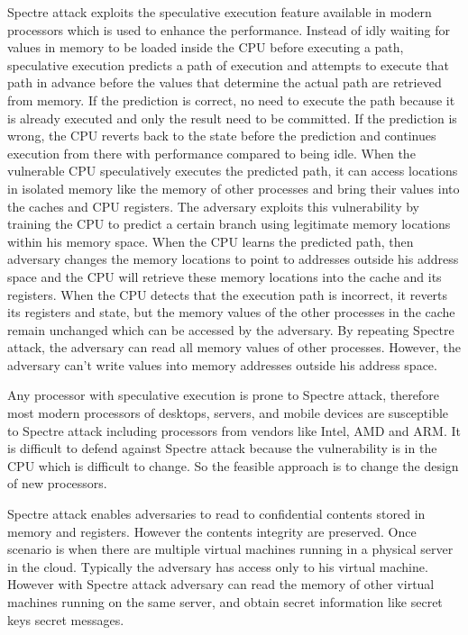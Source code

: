 \documentclass[12pt,a4paper]{article}
\begin{document}
\begin{enumerate}
\color{blue}
Spectre attack exploits the speculative execution feature available in modern processors which is used to enhance the performance. Instead of idly waiting for values in memory to be loaded inside the CPU before executing a path, speculative execution predicts a path of execution and attempts to execute that path in advance before the values that determine the actual path are retrieved from memory. If the prediction is correct, no need to execute the path  because it is already executed and only the result need to be committed. If the prediction is wrong, the CPU reverts back to the state before the prediction and continues execution from there with performance compared to being idle. When the vulnerable CPU speculatively executes the predicted path, it can access locations in isolated memory like the memory of other processes and bring their values into the caches and CPU registers. The adversary exploits this vulnerability by training the CPU to predict a certain branch using legitimate memory locations within his memory space. When the CPU learns the predicted path, then adversary changes the memory locations to point to addresses outside his address space and the CPU will retrieve these memory locations into the cache and its registers. When the CPU detects that the execution path is incorrect, it reverts its registers and state, but the memory values of the other processes in the cache remain unchanged which can be accessed by the adversary. By repeating Spectre attack, the adversary can read all memory values of other processes. However, the adversary can't write values into memory addresses outside his address space.

Any processor with speculative execution is prone to Spectre attack, therefore most modern processors of desktops, servers, and mobile devices are susceptible to Spectre attack including processors from vendors like Intel, AMD and ARM. It is difficult to defend against Spectre attack because the vulnerability is in the CPU which is difficult to change. So the feasible approach is to change the design of new processors. 

Spectre attack enables adversaries to  read to confidential contents stored in memory and registers. However the contents integrity are preserved. Once scenario is when there are multiple virtual machines running in a physical server in the cloud. Typically the adversary has access only to his virtual machine. However with Spectre attack adversary can read the memory of other virtual machines running on the same server, and obtain secret information like secret keys secret messages. 
\color{black}


\end{enumerate}
\end{document}
